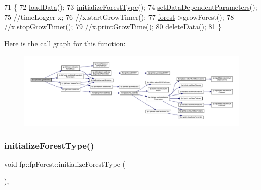 \begin{DoxyCode}
71                              \{
72                 \hyperlink{classfp_1_1fpForest_a01631065f4909f10cea4b690084a345a}{loadData}();
73                 \hyperlink{classfp_1_1fpForest_a776ae408ea6c9af459e6ebba7e363d57}{initializeForestType}();
74                 \hyperlink{classfp_1_1fpForest_a846818c46a4423f668f19d3493864192}{setDataDependentParameters}();
75                 \textcolor{comment}{//timeLogger x;}
76                 \textcolor{comment}{//x.startGrowTimer();}
77                 \hyperlink{classfp_1_1fpForest_a4ce6af867d36c8d62c860db8982235c4}{forest}->growForest();
78                 \textcolor{comment}{//x.stopGrowTimer();}
79                 \textcolor{comment}{//x.printGrowTime();}
80                 \hyperlink{classfp_1_1fpForest_a598d32c816dfe5f9793973dcdff2f76e}{deleteData}();
81             \}
\end{DoxyCode}
Here is the call graph for this function\+:
\nopagebreak
\begin{figure}[H]
\begin{center}
\leavevmode
\includegraphics[width=350pt]{classfp_1_1fpForest_ac617e33890e96ee5e96e286a45d245fe_cgraph}
\end{center}
\end{figure}
\mbox{\label{classfp_1_1fpForest_a776ae408ea6c9af459e6ebba7e363d57}} 
\subsubsection{\texorpdfstring{initialize\+Forest\+Type()}{initializeForestType()}}
{\footnotesize\ttfamily void fp\+::fp\+Forest\+::initialize\+Forest\+Type (\begin{DoxyParamCaption}{ }\end{DoxyParamCaption})\hspace{0.3cm}{\ttfamily [inline]}, {\ttfamily [protected]}}




